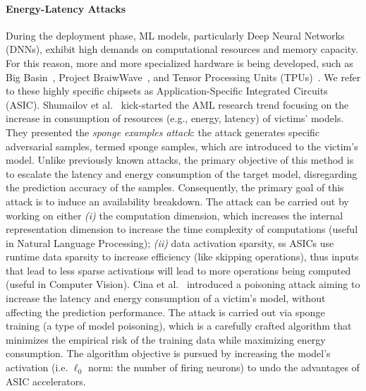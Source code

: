 \paragraph{Energy-Latency Attacks}
During the deployment phase, ML models, particularly Deep Neural Networks (DNNs), exhibit high demands on computational resources and memory capacity.
For this reason, more and more specialized hardware is being developed, such as Big Basin~\cite{hazelwood2018applied}, Project BraiwWave~\cite{chung2018serving}, and Tensor Processing Units (TPUs)~\cite{jouppi2018motivation}.
We refer to these highly specific chipsets as Application-Specific Integrated Circuits (ASIC).
Shumailov et al.~\cite{shumailov2021sponge} kick-started the AML research trend focusing on the increase in consumption of resources (e.g., energy, latency) of victims' models.
They presented the \textit{sponge examples attack}: the attack generates specific adversarial samples, termed sponge samples, which are introduced to the victim's model.
Unlike previously known attacks, the primary objective of this method is to escalate the latency and energy consumption of the target model, disregarding the prediction accuracy of the samples.
Consequently, the primary goal of this attack is to induce an availability breakdown.
The attack can be carried out by working on either \textit{(i)} the computation dimension, which increases the internal representation dimension to increase the time complexity of computations (useful in Natural Language Processing); \textit{(ii)} data activation sparsity, ss ASICs use runtime data sparsity to increase efficiency (like skipping operations), thus inputs that lead to less sparse activations will lead to more operations being computed (useful in Computer Vision).
Cina et al.~\cite{cina2022energy} introduced a poisoning attack aiming to increase the latency and energy consumption of a victim's model, without affecting the prediction performance.
The attack is carried out via sponge training (a type of model poisoning), which is a carefully crafted algorithm that minimizes the empirical risk of the training data while maximizing energy consumption.
The algorithm objective is pursued by increasing the model's activation (i.e. $\ell_0$ norm: the number of firing neurons) to undo the advantages of ASIC accelerators.

